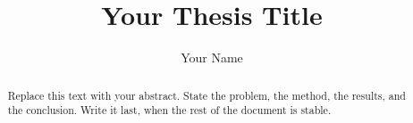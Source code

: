 \documentclass[phd,tables,glossary,12pt,a4paper]{bangor}
\title{Your Thesis Title}
\author{Your Name}
\begin{document}
\maketitle
\statementspage


\begin{abstract}
Replace this text with your abstract. State the problem, the method,
the results, and the conclusion. Write it last, when the rest of the
document is stable.
\end{abstract}

\tables
\printabbrevs






\printbibliography

\appendix

\end{document}
